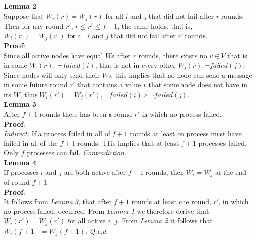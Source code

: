\documentclass[fleqn]{article}
\begin{document}
\noindent \textbf{Lemma 2}:\\
Suppose that $W_i(r) = W_j(r)$ for all $i$ and $j$ that did not fail after $r$ rounds. Then for any round $r',\ r \le r' ≤ f + 1$, the same holds, that is, $W_i(r’) = W_j(r’)$ for all $i$ and $j$ that did not fail after $r’$ rounds.\\
\textbf{Proof}:\\
Since all active nodes have equal $W$s after $r$ rounds, there exists no $v \in V$ that is in some $W_i(r),\ \neg failed(i)$, that is not in every other $W_j(r), \neg failed(j)$.
Since nodes will only send their $W$s, this implies that no node can send a message in some future round $r'$ that contains a value $v$ that some node does not have in its $W$, thus $W_i(r’) = W_j(r’)$, $\neg failed(i) \land \neg failed(j)$.\\

\noindent \textbf{Lemma 3}:\\
After $f+1$ rounds there has been a round $r'$ in which no process failed.\\
\textbf{Proof}:\\
\textit{Indirect:} If a process failed in all of $f+1$ rounds at least on process must have failed in all of the $f+1$ rounds. This implies
that at least $f+1$ processes failed. Only $f$ processes can fail. \textit{Contradiction}.\\


\noindent \textbf{Lemma 4}:\\
If processes $i$ and $j$ are both active after $f+1$ rounds, then $W_i = W_j$ at the end of round $f + 1$.\\
\textbf{Proof}:\\
It follows from \textit{Lemma 3}, that after $f+1$ rounds at least one round, $r'$, in which no process failed, occurred. From \textit{Lemma 1} we therefore derive that $W_i(r') = W_j(r')$ for all active $i,\ j$.
From \textit{Lemma 2} it follows that $W_i(f+1) = W_j(f+1)$. \textit{Q.e.d}.\\
\end{document}
